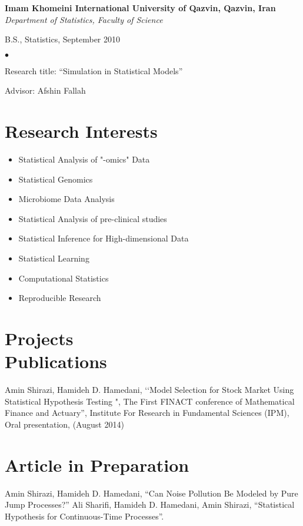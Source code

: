 \documentclass[margin,line]{res}
\newenvironment{list1}{
  \begin{list}{\ding{113}}{%
      \setlength{\itemsep}{0in}
      \setlength{\parsep}{0in} \setlength{\parskip}{0in}
      \setlength{\topsep}{0in} \setlength{\partopsep}{0in}
      \setlength{\leftmargin}{0.17in}}}{\end{list}}
\newenvironment{list2}{
  \begin{list}{$\bullet$}{%
      \setlength{\itemsep}{0in}
      \setlength{\parsep}{0in} \setlength{\parskip}{0in}
      \setlength{\topsep}{0in} \setlength{\partopsep}{0in}
      \setlength{\leftmargin}{0.2in}}}{\end{list}}
\begin{document}
\begin{resume}
{\bf Imam Khomeini International University of Qazvin, Qazvin, Iran} \\
{\em 	Department of Statistics, Faculty of Science}\\
\vspace*{-.1in}
\begin{list1}
	\item[]B.S., Statistics, September 2010
	\begin{list2}
		\vspace*{.05in}
		\item[] Research title:  ``Simulation in Statistical Models''
		\item[] Advisor: Afshin Fallah
	\end{list2}
\end{list1}
\section{\sc Research Interests}
\begin{itemize}
	\item Statistical Analysis of "-omics" Data
	\item Statistical Genomics
	\item Microbiome Data Analysis
	\item Statistical Analysis of pre-clinical studies
	\item Statistical Inference for High-dimensional Data
	\item Statistical Learning
	\item Computational Statistics
	\item Reproducible Research
\end{itemize}



\section{\sc Projects \\  Publications }
	Amin Shirazi, Hamideh D. Hamedani, ‘‘Model Selection for Stock Market Using Statistical Hypothesis Testing ", The First FINACT conference of Mathematical Finance and Actuary”, Institute For Research in Fundamental Sciences (IPM), Oral presentation, (August 2014) 
\section{\sc Article in Preparation}
Amin Shirazi, Hamideh D. Hamedani, “Can Noise Pollution Be Modeled by Pure Jump Processes?”\vspace{0.3cm}
Ali Sharifi, Hamideh D. Hamedani, Amin Shirazi, “Statistical Hypothesis for Continuous-Time Processes”. 


\end{resume}
\end{document}
